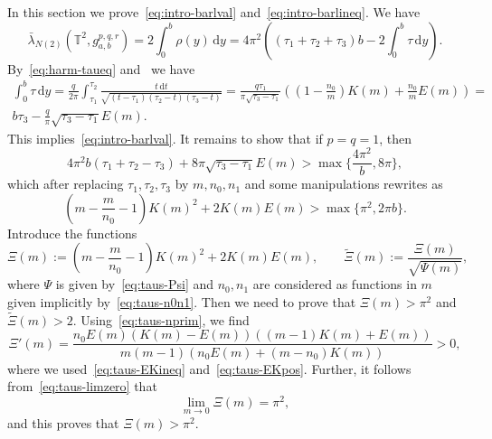 \documentclass{amsart}
\renewcommand{\d}{\mathrm{d}}
\theoremstyle{plain}
\theoremstyle{definition}
\theoremstyle{remark}
\begin{document}
In this section we prove~\eqref{eq:intro-barlval} and~\eqref{eq:intro-barlineq}.
We have
\[
\bar\lambda_{N(2)}(\mathbb T^2,g_{a,b}^{p,q,r})=
2\int_0^b\rho(y)\,\d y=
4\pi^2((\tau_1+\tau_2+\tau_3)b-2\int_0^b\tau\,\d y).
\]
By~\eqref{eq:harm-taueq} and~\cite[233.17 and 331.01]{BF1971} we have
\begin{multline*}
\int_0^b\tau\,\d y=
\frac{q}{2\pi}\int_{\tau_1}^{\tau_2}
\frac{t\,\d t}{\sqrt{(t-\tau_1)(\tau_2-t)(\tau_3-t)}}=
\frac{q\tau_1}{\pi\sqrt{\tau_3-\tau_1}}\left(\left(1-\frac{n_0}m\right)K(m)+
\frac{n_0}m E(m)\right)=\\
b\tau_3-\frac{q}\pi\sqrt{\tau_3-\tau_1}E(m).
\end{multline*}
This implies~\eqref{eq:intro-barlval}. It remains to show that if \(p=q=1\),
then
\[
4\pi^2 b(\tau_1+\tau_2-\tau_3)+8\pi\sqrt{\tau_3-\tau_1}E(m)>
\max\bigl\{\frac{4\pi^2}b,8\pi\bigr\},
\]
which after replacing \(\tau_1,\tau_2,\tau_3\) by \(m,n_0,n_1\) and some
manipulations rewrites as
\[
\left(m-\frac{m}{n_0}-1\right)K(m)^2+2K(m)E(m)>\max\{\pi^2,2\pi b\}.
\]
Introduce the functions
\[
\Xi(m):=\left(m-\frac{m}{n_0}-1\right)K(m)^2+2K(m)E(m),\qquad
\widetilde\Xi(m):=\frac{\Xi(m)}{\sqrt{\Psi(m)}},
\]
where \(\Psi\) is given by~\eqref{eq:taus-Psi} and \(n_0,n_1\) are considered as
functions in \(m\) given implicitly by~\eqref{eq:taus-n0n1}. Then we need to
prove that \(\Xi(m)>\pi^2\) and \(\tilde\Xi(m)>2\). Using~\eqref{eq:taus-nprim},
we find
\[
\Xi'(m)=\frac{n_0E(m)(K(m)-E(m))((m-1)K(m)+E(m))}{m(m-1)
(n_0 E(m)+(m-n_0)K(m))}>0,
\]
where we used~\eqref{eq:taus-EKineq} and~\eqref{eq:taus-EKpos}. Further, it
follows from~\eqref{eq:taus-limzero} that
\[
\lim_{m\to 0}\Xi(m)=\pi^2,
\]
and this proves that \(\Xi(m)>\pi^2\).
\end{document}
